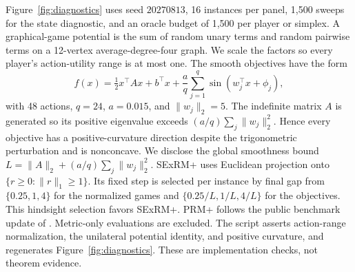 \documentclass{article}
\begin{document}
Figure~\ref{fig:diagnostics} uses seed $20270813$, 16 instances per panel, 1,500 sweeps for the state diagnostic, and an oracle budget of 1,500 per player or simplex. A graphical-game potential is the sum of random unary terms and random pairwise terms on a 12-vertex average-degree-four graph. We scale the factors so every player's action-utility range is at most one. The smooth objectives have the form
\begin{equation}
f(x)=\tfrac12x^\top Ax+b^\top x+\frac{a}{q}\sum_{j=1}^q\sin(w_j^\top x+\phi_j),
\end{equation}
with 48 actions, $q=24$, $a=0.015$, and $\|w_j\|_2=5$. The indefinite matrix $A$ is generated so its positive eigenvalue exceeds $(a/q)\sum_j\|w_j\|_2^2$. Hence every objective has a positive-curvature direction despite the trigonometric perturbation and is nonconcave. We disclose the global smoothness bound $L=\|A\|_2+(a/q)\sum_j\|w_j\|_2^2$. SExRM+ uses Euclidean projection onto $\{r\ge0:\|r\|_1\ge1\}$. Its fixed step is selected per instance by final gap from $\{0.25,1,4\}$ for the normalized games and $\{0.25/L,1/L,4/L\}$ for the objectives. This hindsight selection favors SExRM+. PRM+ follows the public benchmark update of \citet{Tewolde26:Decision}. Metric-only evaluations are excluded. The script asserts action-range normalization, the unilateral potential identity, and positive curvature, and regenerates Figure~\ref{fig:diagnostics}. These are implementation checks, not theorem evidence.
\end{document}
